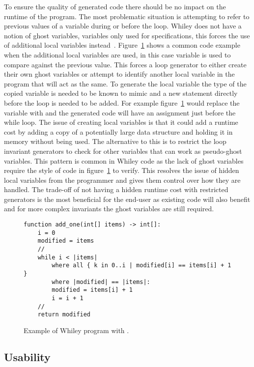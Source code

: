 To ensure the quality of generated code there should be no impact on the
runtime of the program.
The most problematic situation is attempting to refer to previous values of
a variable during or before the loop.
Whiley does not have a notion of ghost variables, variables only used for
specifications, this forces the use of additional local variables instead~\cite{whiley-origin}.
Figure~\ref{lst:vars} shows a common code example when the additional local
variables are used, in this case  variable is used to compare
against the previous value.
This forces a loop generator to either create their own ghost variables or
attempt to identify another local variable in the program that will act as the
same.
To generate the local variable the type of the copied variable is needed to be
known to mimic and a new statement directly before the loop is needed to be
added.
For example figure~\ref{lst:vars} would replace the  variable
with  and the generated code will have an assignment just before
the while loop.
The issue of creating local variables is that it could add a runtime cost by
adding a copy of a potentially large data structure
and holding it in memory without being used.
The alternative to this is to restrict the loop invariant generators to check
for other variables that can work as pseudo-ghost variables.
This pattern is common in Whiley code as the lack of ghost variables require
the style of code in figure~\ref{lst:vars} to verify.
This resolves the issue of hidden local variables from the programmer
and gives them control over how they are handled.
The trade-off of not having a hidden runtime cost with restricted generators
is the most beneficial for the end-user as existing code will also benefit
and for more complex invariants the ghost variables are still required.

\begin{figure}[ht]
\begin{lstlisting}
function add_one(int[] items) -> int[]:
    i = 0
    modified = items
    //
    while i < |items|
        where all { k in 0..i | modified[i] == items[i] + 1 }
        where |modified| == |items|:
        modified = items[i] + 1
        i = i + 1
    //
    return modified
\end{lstlisting}
\caption{Example of Whiley program with .}
\label{lst:vars}
\end{figure}

\subsection{Usability}

